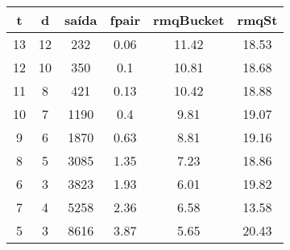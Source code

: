 \begin{tabular}{|c|c|c|c|c|c|}
\hline
\textbf{t} & \textbf{d} & \textbf{saída} & \textbf{fpair} & \textbf{rmqBucket} & \textbf{rmqSt}\\
\hline
13 & 12 & 232 & 0.06 & 11.42 & 18.53\\
\hline
12 & 10 & 350 & 0.1 & 10.81 & 18.68\\
\hline
11 & 8 & 421 & 0.13 & 10.42 & 18.88\\
\hline
10 & 7 & 1190 & 0.4 & 9.81 & 19.07\\
\hline
9 & 6 & 1870 & 0.63 & 8.81 & 19.16\\
\hline
8 & 5 & 3085 & 1.35 & 7.23 & 18.86\\
\hline
6 & 3 & 3823 & 1.93 & 6.01 & 19.82\\
\hline
7 & 4 & 5258 & 2.36 & 6.58 & 13.58\\
\hline
5 & 3 & 8616 & 3.87 & 5.65 & 20.43\\
\hline
\end{tabular}
